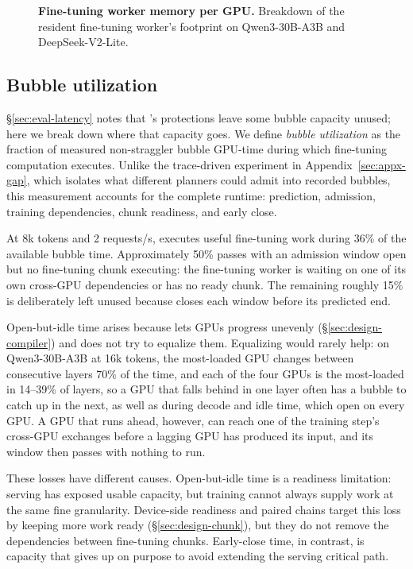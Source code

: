 \begin{figure}[t]
  \centering
  \caption{\textbf{Fine-tuning worker memory per GPU.} Breakdown of the resident
    \sys{} fine-tuning worker's footprint on Qwen3-30B-A3B and DeepSeek-V2-Lite.}
  \label{fig:appx-mem-breakdown}
\end{figure}

\subsection{Bubble utilization}
\label{sec:appx-bubble-use}

\S\ref{sec:eval-latency} notes that \sys{}'s protections leave some bubble
capacity unused; here we break down where that capacity goes. We define \emph{bubble utilization} as the fraction of measured
non-straggler bubble GPU-time during which fine-tuning computation
executes. Unlike the trace-driven experiment in Appendix~\ref{sec:appx-gap}, which
isolates what different planners could admit into recorded bubbles,
this measurement accounts for the complete \sys{} runtime: prediction,
admission, training dependencies, chunk readiness, and early close.

At 8k tokens and 2 requests/s, \sys{} executes useful fine-tuning work
during 36\% of the available bubble time. Approximately 50\% passes with
an admission window open but no fine-tuning chunk executing: the
fine-tuning worker is waiting on one of its own cross-GPU dependencies or has no ready
chunk. The remaining roughly 15\% is deliberately left unused because
\sys{} closes each window before its predicted end.

Open-but-idle time arises because \sys{} lets GPUs progress unevenly
(\S\ref{sec:design-compiler}) and does not try to equalize them.
Equalizing would rarely help: on Qwen3-30B-A3B at 16k tokens, the
most-loaded GPU changes between consecutive layers 70\% of the time,
and each of the four GPUs is the most-loaded in 14--39\% of layers,
so a GPU that falls behind in one layer often has a bubble to catch up in
the next, as well as during decode and idle time, which open on every
GPU. A GPU that runs ahead, however, can reach one of the training
step's cross-GPU exchanges before a lagging GPU has produced its
input, and its window then passes with nothing to run.

These losses have different causes. Open-but-idle time is a readiness
limitation: serving has exposed usable capacity, but training cannot
always supply work at the same fine granularity. Device-side
readiness and paired chains target this loss by keeping more work ready
(\S\ref{sec:design-chunk}), but they do not remove the dependencies
between fine-tuning chunks. Early-close time, in contrast, is capacity that
\sys{} gives up on purpose to avoid extending the serving critical path.

